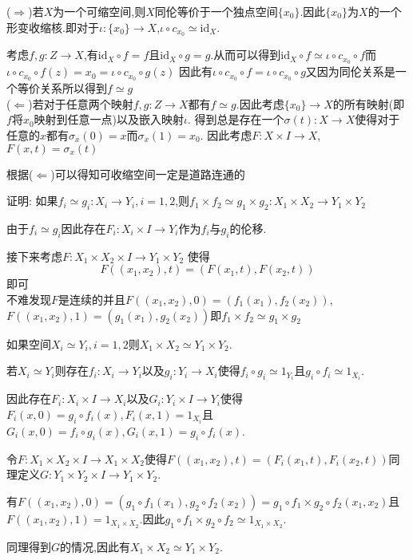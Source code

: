 \documentclass{article}
\begin{document}
\begin{solution}
    ($\Rightarrow$)若$X$为一个可缩空间,则$X$同伦等价于一个独点空间$\{x_0\}$.因此$\{x_0\}$为$X$的一个形变收缩核.即对于$\iota : \{x_0\} \to X$,$\iota\circ c_{x_0} \simeq \text{id}_X$.


    考虑$f ,g :Z\to X$,有$\text{id}_X \circ f = f$且$\text{id}_X \circ g = g$.从而可以得到$\text{id}_X\circ f \simeq \iota\circ c_{x_0} \circ f$而$\iota \circ c_{x_0} \circ f(z) = x_0 = \iota \circ c_{x_0} \circ g(z)$
    因此有$\iota \circ c_{x_0} \circ f = \iota \circ c_{x_0} \circ g$又因为同伦关系是一个等价关系所以得到$f \simeq g$\\
    ($\Leftarrow$)若对于任意两个映射$f ,g : Z \to X$都有$f \simeq g$.因此考虑$\{x_0\} \to X$的所有映射(即$f$将$x_0$映射到任意一点)以及嵌入映射$\iota$.
    得到总是存在一个$\sigma(t): X\to X$使得对于任意的$x$都有$\sigma_x(0) = x$而$\sigma_x(1) = x_0$.
    因此考虑$F : X \times I \to X$,$F(x,t) = \sigma_x(t)$


    根据($\Leftarrow$)可以得知可收缩空间一定是道路连通的
\end{solution}
\begin{exercise}
    证明: 如果$f_i \simeq g_i: X_i \to Y_i,i= 1,2$,则$f_1 \times f_2 \simeq g_1 \times g_2: X_1 \times X_2  \to Y_1 \times Y_2$
\end{exercise}
\begin{solution}
    由于$f_i \simeq g_i$因此存在$F_i: X_i \times I \to Y_i$作为$f_i$与$g_i$的伦移.


    接下来考虑$F : X_1 \times X_2 \times I \to Y_1 \times Y_2$
    使得
    $$
    F((x_1,x_2),t) = (F(x_1,t),F(x_2,t))
    $$
    即可\\
    不难发现$F$是连续的并且$F((x_1,x_2),0) = (f_1(x_1),f_2(x_2))$,$F((x_1,x_2),1) = (g_1(x_1),g_2(x_2))$即$f_1 \times f_2 \simeq g_1 \times g_2$
\end{solution}
\begin{exercise}
    如果空间$X_i \simeq Y_i,i= 1,2$则$X_1 \times X_2 \simeq Y_1 \times Y_2$.
\end{exercise}
\begin{solution}
    若$X_i \simeq Y_i$则存在$f_i : X_i \to Y_i$以及$g_i : Y_i \to X_i$使得$f_i \circ g_i \simeq 1_{Y_i}$且$g_i \circ f_i \simeq 1_{X_i}$.


    因此存在$F_i : X_i \times I \to X_i$以及$G_i: Y_i \times I \to Y_i$使得$F_i(x,0) = g_i\circ f_i(x),F_i(x,1) = 1_{X_i}$且$G_i(x,0) = f_i \circ g_i (x),G_i(x,1) = g_i\circ f_i (x)$.
    
    
    令$F : X_1 \times X_2 \times I \to X_1 \times X_2$使得$F((x_1,x_2),t) = (F_i(x_1,t),F_i(x_2,t))$同理定义$G : Y_1 \times Y_2 \times I \to Y_1 \times Y_2$.

    有$F((x_1,x_2),0) = (g_1 \circ f_1(x_1),g_2 \circ f_2(x_2)) = g_1 \circ f_1 \times g_2 \circ f_2(x_1,x_2)$且$F((x_1,x_2),1) = 1_{X_1 \times X_2}$.因此$g_1 \circ f_1 \times g_2 \circ f_2 \simeq 1_{X_1 \times X_2}$.
    
    
    同理得到$G$的情况,因此有$X_1 \times X_2 \simeq Y_1 \times Y_2$.
\end{solution}
\end{document}
